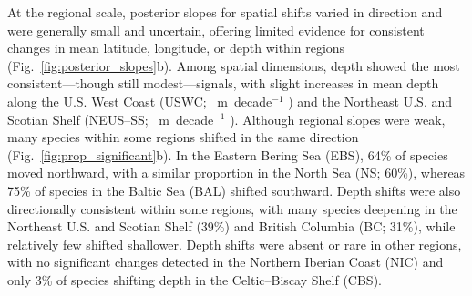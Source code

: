 \documentclass[pdflatex,sn-nature,referee]{sn-jnl}%
\begin{document}




At the regional scale, posterior slopes for spatial shifts varied in direction and were generally small and uncertain, offering limited evidence for consistent changes in mean latitude, longitude, or depth within regions (Fig.~\ref{fig:posterior_slopes}b). Among spatial dimensions, depth showed the most consistent---though still modest---signals, with slight increases in mean depth along the U.S. West Coast (USWC; \DepthUSWCMedian{}~m~decade$^{-1}$ \DepthUSWCCI{}) and the Northeast U.S. and Scotian Shelf (NEUS–SS; \DepthNEUSMedian{}~m~decade$^{-1}$ \DepthNEUSCI{}). Although regional slopes were weak, many species within some regions shifted in the same direction (Fig.~\ref{fig:prop_significant}b). In the Eastern Bering Sea (EBS), 64\% of species moved northward, with a similar proportion in the North Sea (NS; 60\%), whereas 75\% of species in the Baltic Sea (BAL) shifted southward. Depth shifts were also directionally consistent within some regions, with many species deepening in the Northeast U.S. and Scotian Shelf (39\%) and British Columbia (BC; 31\%), while relatively few shifted shallower. Depth shifts were absent or rare in other regions, with no significant changes detected in the Northern Iberian Coast (NIC) and only 3\% of species shifting depth in the Celtic–Biscay Shelf (CBS).
\end{document}
